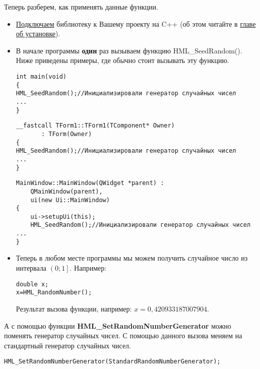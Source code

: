Теперь разберем, как применять данные функции.

\begin{itemize}
\item \hyperref[section_install]{Подключаем} библиотеку к Вашему проекту на C++ (об этом читайте в \hyperref[section_install]{главе об установке}).
\item В начале программы \textbf{один} раз вызываем функцию HML\_SeedRandom(). Ниже приведены примеры, где обычно стоит вызывать эту функцию.

\begin{lstlisting}[label=random_console,caption=Применение HML\_SeedRandom для консольного приложения]
int main(void)
{
HML_SeedRandom();//Инициализировали генератор случайных чисел
...
} 
\end{lstlisting}

\begin{lstlisting}[label=random_cbuilder,caption=Применение HML\_SeedRandom для C++Builder]
__fastcall TForm1::TForm1(TComponent* Owner)
       : TForm(Owner)
{
HML_SeedRandom();//Инициализировали генератор случайных чисел
...
}
\end{lstlisting}

\begin{lstlisting}[label=random_qt,caption=Применение HML\_SeedRandom для Qt]
MainWindow::MainWindow(QWidget *parent) :
    QMainWindow(parent),
    ui(new Ui::MainWindow)
{
    ui->setupUi(this);
    HML_SeedRandom();//Инициализировали генератор случайных чисел
...
}
\end{lstlisting}

\item Теперь в любом месте программы мы можем получить случайное число из интервала $ \left(0; 1\right]  $. Например:

\begin{lstlisting}[label=random_use,caption=Применение ГСЧ]
double x;
x=HML_RandomNumber();
\end{lstlisting}

Результат вызова функции, например: $ x = 0,420933187007904 $.

\end{itemize}

А с помощью функции \textbf{HML\_SetRandomNumberGenerator} можно поменять генератор случайных чисел. С помощью данного вызова меняем на стандартный генератор случайных чисел.
\begin{lstlisting}[label=SetRandomNumberGenerator,caption=Меняем на стандартный генератор случайных чисел]
HML_SetRandomNumberGenerator(StandardRandomNumberGenerator);
\end{lstlisting}

